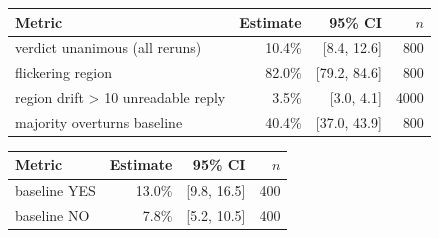 \begin{tabular}{lrrr}
\toprule
Metric & Estimate & 95\% CI & $n$ \\
\midrule
verdict unanimous (all reruns) & 10.4\% & [8.4, 12.6] & 800 \\
flickering region & 82.0\% & [79.2, 84.6] & 800 \\
region drift > 10%
unreadable reply & 3.5\% & [3.0, 4.1] & 4000 \\
majority overturns baseline & 40.4\% & [37.0, 43.9] & 800 \\
\bottomrule
\end{tabular}

\begin{tabular}{lrrr}
\toprule
Metric & Estimate & 95\% CI & $n$ \\
\midrule
baseline YES & 13.0\% & [9.8, 16.5] & 400 \\
baseline NO & 7.8\% & [5.2, 10.5] & 400 \\
\bottomrule
\end{tabular}

